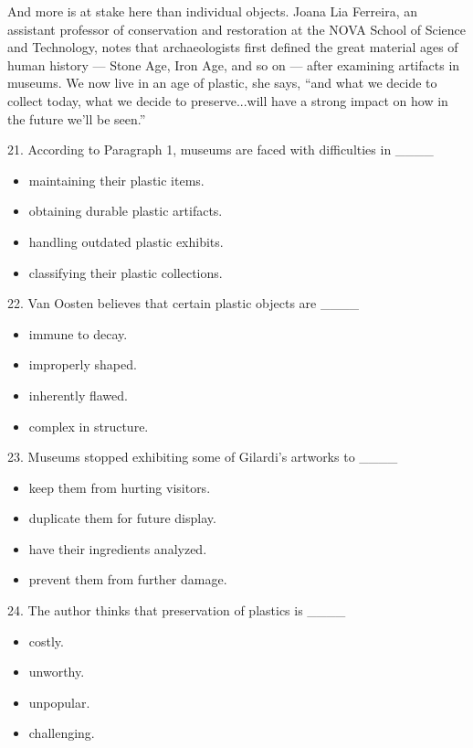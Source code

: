 \documentclass[UTF8,11pt]{ctexart}
\begin{document}
And more is at stake here than individual objects. Joana Lia Ferreira, an assistant professor of conservation and restoration at the NOVA School of Science and Technology, notes that archaeologists first defined the great material ages of human history — Stone Age, Iron Age, and so on — after examining artifacts in museums. We now live in an age of plastic, she says, “and what we decide to collect today, what we decide to preserve...will have a strong impact on how in the future we’ll be seen.”


21. According to Paragraph 1, museums are faced with difficulties in \_\_\_\_


\begin{itemize}[leftmargin=2em,itemsep=.2em,topsep=.4em]\item[A.] maintaining their plastic items.
\item[B.] obtaining durable plastic artifacts.
\item[C.] handling outdated plastic exhibits.
\item[D.] classifying their plastic collections.
\end{itemize}

22. Van Oosten believes that certain plastic objects are \_\_\_\_


\begin{itemize}[leftmargin=2em,itemsep=.2em,topsep=.4em]\item[A.] immune to decay.
\item[B.] improperly shaped.
\item[C.] inherently flawed.
\item[D.] complex in structure.
\end{itemize}

23. Museums stopped exhibiting some of Gilardi’s artworks to \_\_\_\_


\begin{itemize}[leftmargin=2em,itemsep=.2em,topsep=.4em]\item[A.] keep them from hurting visitors.
\item[B.] duplicate them for future display.
\item[C.] have their ingredients analyzed.
\item[D.] prevent them from further damage.
\end{itemize}

24. The author thinks that preservation of plastics is \_\_\_\_


\begin{itemize}[leftmargin=2em,itemsep=.2em,topsep=.4em]\item[A.] costly.
\item[B.] unworthy.
\item[C.] unpopular.
\item[D.] challenging.
\end{itemize}
\end{document}
